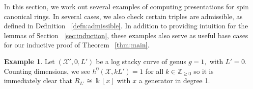 \documentclass{amsart}
\theoremstyle{plain}
\theoremstyle{definition}
\newtheorem{example}[thm]{Example}
\theoremstyle{remark}
\numberwithin{equation}{section}
\newcommand\Bk{{\Bbbk}}
\newcommand\sx{\mathscr X}
\newcommand{\halfcan}{L}
\begin{document}
In this section, we work out several examples of computing presentations for spin canonical rings. In several cases, we also check certain triples are admissible, as defined in Definition ~\ref{defn:admissible}. In addition to providing intuition for the lemmas of Section ~\ref{sec:induction}, these examples also serve as useful base cases for our inductive proof of Theorem ~\ref{thm:main}.

\begin{example}
\label{eg:base-1-0}
Let $(\sx',0, \halfcan')$ be a log stacky curve of genus $g = 1,$ with $\halfcan' = 0$.
Counting dimensions, we see $h^0(\sx, k\halfcan')=1$ for all $k \in \mathbb{Z}_{\ge 0}$ so it is immediately clear that $R_{\halfcan'} \cong \Bk[x]$ with $x$ a generator in degree 1.
\end{example}
\end{document}
